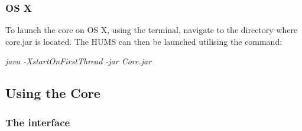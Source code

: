 \documentclass[10pt,a4paper]{article}
\begin{document}
\subsubsection{OS X}
To launch the core on OS X, using the terminal, navigate to the directory where core.jar is located. The HUMS can then be launched utilising the command:
\begin{center}
\textit{java -XstartOnFirstThread -jar Core.jar}
\end{center}

\subsection{Using the Core}
\label{sec:core}

\subsubsection{The interface}
\end{document}
